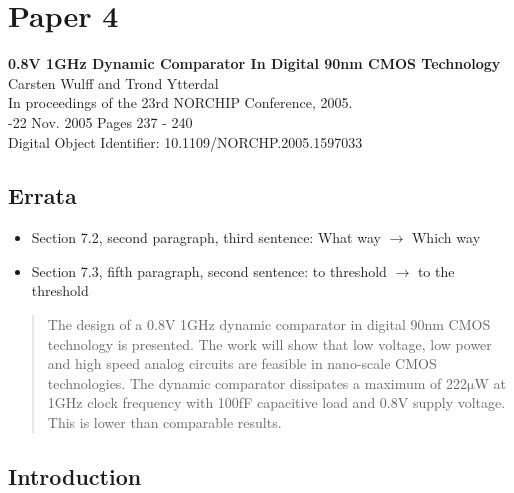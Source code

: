 
\chapter{Paper 4}\label{sc:p4}
\textbf{\Large 0.8V 1GHz Dynamic Comparator In Digital 90nm CMOS
  Technology}\\
\indent   Carsten Wulff and Trond Ytterdal\\
\indent In proceedings of the 23rd NORCHIP Conference, 2005. \\
-22 Nov. 2005 Pages 237 - 240 \\
\indent Digital Object Identifier: 10.1109/NORCHP.2005.1597033\\

\renewcommand\myfigname{p1fig:}
\renewcommand\myeqname{p1eq:}

\section*{Errata}
\begin{itemize}
\item Section 7.2, second paragraph, third sentence: What way
  $\rightarrow$ Which way
\item Section 7.3, fifth paragraph, second sentence: to threshold
  $\rightarrow$ to the threshold
\end{itemize}

\begin{abstract}
The design of a 0.8V 1GHz dynamic comparator in digital 90nm
CMOS technology is presented. The work will show that low voltage, low
power and high speed analog circuits are feasible in nano-scale CMOS
technologies. The dynamic comparator dissipates a maximum of
222\begin{math}\mathrm{\mu}\end{math}W at 1GHz clock frequency with
100fF capacitive load and 0.8V supply voltage. This is lower than
comparable results. 
\end{abstract}


\section{Introduction}

